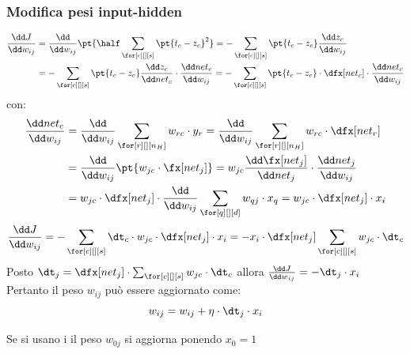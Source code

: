 \subsubsection{Modifica pesi input-hidden}\label{sec:bp_modifica_pesi_input_hidden} %
\begin{equation}
    \begin{aligned}
        \frac{\dd J}{\dd w_{ij}} &= \frac{\dd}{\dd w_{ij}}\pt{\half\sum_{\for[c][][s]}\pt{t_c-z_c}^2} = -\sum_{\for[c][][s]}\pt{t_c-z_c}\frac{\dd z_c}{\dd w_{ij}} \\
                                 &= -\sum_{\for[c][][s]}\pt{t_c-z_c}\frac{\dd z_c}{\dd net_c}\cdot\frac{\dd net_c}{\dd w_{ij}} = -\sum_{\for[c][][s]}\pt{t_c-z_c}\cdot\dfx[net_c]\cdot\frac{\dd net_c}{\dd w_{ij}} \\
    \end{aligned}
\end{equation}
con:
\begin{equation*}
    \begin{aligned}
        \frac{\dd net_c}{\dd w_{ij}} &= \frac{\dd}{\dd w_{ij}}\sum_{\for[r][][n_H]}w_{rc}\cdot y_r = \frac{\dd}{\dd w_{ij}} \sum_{\for[r][][n_H]}w_{rc}\cdot\dfx[net_r] \\
                                     &= \frac{\dd}{\dd w_{ij}}\pt{w_{jc}\cdot\fx[net_j]} = w_{jc}\frac{\dd \fx[net_j]}{\dd net_j}\cdot\frac{\dd net_j}{\dd w_{ij}} \\
                                     &= w_{jc} \cdot \dfx[net_j] \cdot \frac{\dd}{\dd w_{ij}} \sum_{\for[q][][d]}w_{qj}\cdot x_q = w_{jc} \cdot \dfx[net_j] \cdot x_i
    \end{aligned}
\end{equation*}
\begin{equation*}
    \frac{\dd J}{\dd w_{ij}} = -\sum_{\for[c][][s]}\dt_c \cdot w_{jc} \cdot \dfx[net_j]\cdot x_i = -x_i \cdot \dfx[net_j]\sum_{\for[c][][s]}w_{jc}\cdot\dt_c
\end{equation*}
Posto $\dt_j = \dfx[net_j]\cdot\sum_{\for[c][][s]}w_{jc}\cdot \dt_c$ allora $\frac{\dd J}{\dd w_{ij}} = -\dt_j \cdot x_i$
\\
Pertanto il peso $w_{ij}$ può essere aggiornato come:
\begin{equation}\label{eq:bp-input-hidden}
    w_{ij} = w_{ij} + \eta \cdot \dt_j \cdot x_i
\end{equation}
\begin{note}
    Se si usano i  il peso $w_{0j}$ si aggiorna ponendo $x_0 = 1$
\end{note}
%
